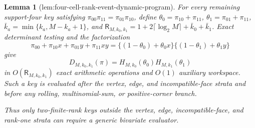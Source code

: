 \documentclass{article}
\newtheorem{lemma}{Lemma}
\begin{document}
\begin{lemma}[lem:four-cell-rank-event-dynamic-program]
For every remaining support-four key satisfying \(\pi_{00}\pi_{11}=\pi_{01}\pi_{10}\), define \(\theta_0=\pi_{10}+\pi_{11}\), \(\theta_1=\pi_{01}+\pi_{11}\), \(\bar k_a=\min\{k_a,M-k_a+1\}\), and \(\mathsf R_{M,k_0,k_1}=1+2\lceil\log_2M\rceil+\bar k_0+\bar k_1\). Exact determinant testing and the factorization
\[
\pi_{00}+\pi_{10}x+\pi_{01}y+\pi_{11}xy
=\{(1-\theta_0)+\theta_0x\}\{(1-\theta_1)+\theta_1y\}
\]
give
\[
D_{M,k_0,k_1}(\pi)=H_{M,k_0}(\theta_0)H_{M,k_1}(\theta_1)
\]
in \(O(\mathsf R_{M,k_0,k_1})\) exact arithmetic operations and \(O(1)\) auxiliary workspace. Such a key is evaluated after the vertex, edge, and incompatible-face strata and before any rolling, multinomial-sum, or positive-corner branch.

Thus only two-finite-rank keys outside the vertex, edge, incompatible-face, and rank-one strata can require a generic bivariate evaluator.
\end{lemma}
\end{document}
